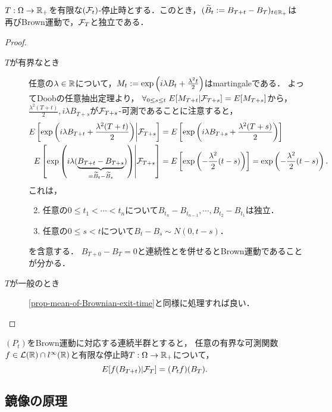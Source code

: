 \documentclass[uplatex,dvipdfmx]{jsreport}
\begin{document}
\begin{theorem}

    $T:\Omega\to\mathbb{R}_+$を有限な$(\mathcal{F}_t)$-停止時とする．このとき，$(\widetilde{B}_t:=B_{T+t}-B_T)_{t\in\mathbb{R}_+}$は再びBrown運動で，$\mathcal{F}_T$と独立である．
\end{theorem}
\begin{proof}\mbox{}
    \begin{description}
        \item[$T$が有界なとき]
        任意の$\lambda\in\mathbb{R}$について，$M_t:=\exp\left(i\lambda B_t+\frac{\lambda^2t}{2}\right)$はmartingaleである．
        よってDoobの任意抽出定理より，
        $\forall_{0\le s\le t}\;E[M_{T+t}|\mathcal{F}_{T+s}]=E[M_{T+s}]$から，$\frac{\lambda^2(T+t)}{2},i\lambda B_{T+s}$が$\mathcal{F}_{T+s}$-可測であることに注意すると，
        \begin{align*}
            E\left[\exp\left(i\lambda B_{T+t}+\frac{\lambda^2(T+t)}{2}\right)\middle|\mathcal{F}_{T+s}\right]&=E\left[\exp\left(i\lambda B_{T+s}+\frac{\lambda^2(T+s)}{2}\right)\right]\\
            E\left[\exp\left(i\lambda(\underbrace{B_{T+t}-B_{T+s}}_{=\widetilde{B}_t-\widetilde{B}_s})\right)\middle|\mathcal{F}_{T+s}\right]&=E\left[\exp\left(-\frac{\lambda^2}{2}(t-s)\right)\right]=\exp\left(-\frac{\lambda^2}{2}(t-s)\right).
        \end{align*}
        これは，
        \begin{enumerate}[({B}1)]\setcounter{enumi}{1}
            \item 任意の$0\le t_1<\cdots<t_n$について$B_{t_n}-B_{t_{n-1}},\cdots,B_{t_2}-B_{t_1}$は独立．
            \item 任意の$0\le s<t$について$B_t-B_s\sim N(0,t-s)$．
        \end{enumerate}
        を含意する．
        $B_{T+0}-B_T=0$と連続性とを併せるとBrown運動であることが分かる．
        \item[$T$が一般のとき] \ref{prop-mean-of-Brownian-exit-time}と同様に処理すれば良い．
    \end{description}
\end{proof}

\begin{corollary}[時間一様性]
    $(P_t)$をBrown運動に対応する連続半群とすると，
    任意の有界な可測関数$f\in\mathcal{L}(\mathbb{R})\cap l^\infty(\mathbb{R})$と有限な停止時$T:\Omega\to\mathbb{R}_+$について，
    \[E[f(B_{T+t})|\mathcal{F}_T]=(P_tf)(B_T).\]
\end{corollary}

\subsection{鏡像の原理}
\end{document}
